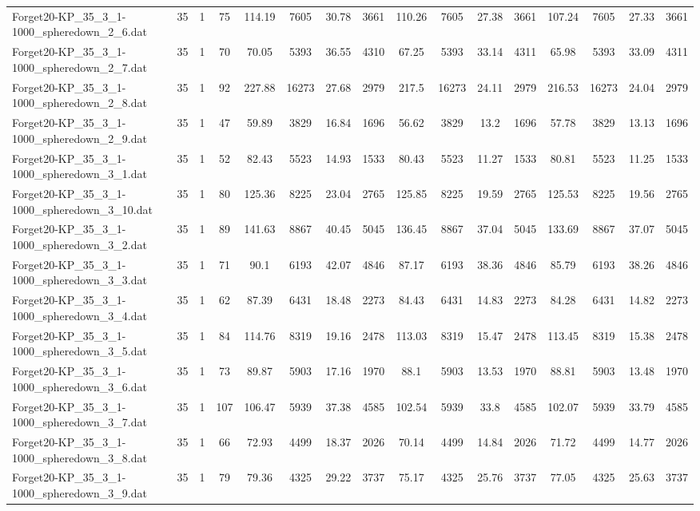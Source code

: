 \begin{sidewaystable}[!ht]
{\begin{tabular}{lccccccccccccccc}
Forget20-KP\_35\_3\_1-1000\_spheredown\_2\_6.dat & 35 & 1 & 75 & 114.19 & 7605 & 30.78 & 3661 & 110.26 & 7605 & 27.38 & 3661 & 107.24 & 7605 &  \textcolor{blue2}{27.33} & 3661 \\
Forget20-KP\_35\_3\_1-1000\_spheredown\_2\_7.dat & 35 & 1 & 70 & 70.05 & 5393 & 36.55 & 4310 & 67.25 & 5393 & 33.14 & 4311 & 65.98 & 5393 & 33.09 & 4311 \\
Forget20-KP\_35\_3\_1-1000\_spheredown\_2\_8.dat & 35 & 1 & 92 & 227.88 & 16273 & 27.68 & 2979 & 217.5 & 16273 & 24.11 & 2979 & 216.53 & 16273 & 24.04 & 2979 \\
Forget20-KP\_35\_3\_1-1000\_spheredown\_2\_9.dat & 35 & 1 & 47 & 59.89 & 3829 & 16.84 & 1696 & 56.62 & 3829 & 13.2 & 1696 & 57.78 & 3829 & 13.13 & 1696 \\
Forget20-KP\_35\_3\_1-1000\_spheredown\_3\_1.dat & 35 & 1 & 52 & 82.43 & 5523 & 14.93 & 1533 & 80.43 & 5523 & 11.27 & 1533 & 80.81 & 5523 & 11.25 & 1533 \\
Forget20-KP\_35\_3\_1-1000\_spheredown\_3\_10.dat & 35 & 1 & 80 & 125.36 & 8225 & 23.04 & 2765 & 125.85 & 8225 & 19.59 & 2765 & 125.53 & 8225 & 19.56 & 2765 \\
Forget20-KP\_35\_3\_1-1000\_spheredown\_3\_2.dat & 35 & 1 & 89 & 141.63 & 8867 & 40.45 & 5045 & 136.45 & 8867 & 37.04 & 5045 & 133.69 & 8867 & 37.07 & 5045 \\
Forget20-KP\_35\_3\_1-1000\_spheredown\_3\_3.dat & 35 & 1 & 71 & 90.1 & 6193 & 42.07 & 4846 & 87.17 & 6193 & 38.36 & 4846 & 85.79 & 6193 & 38.26 & 4846 \\
Forget20-KP\_35\_3\_1-1000\_spheredown\_3\_4.dat & 35 & 1 & 62 & 87.39 & 6431 & 18.48 & 2273 & 84.43 & 6431 & 14.83 & 2273 & 84.28 & 6431 & 14.82 & 2273 \\
Forget20-KP\_35\_3\_1-1000\_spheredown\_3\_5.dat & 35 & 1 & 84 & 114.76 & 8319 & 19.16 & 2478 & 113.03 & 8319 & 15.47 & 2478 & 113.45 & 8319 & 15.38 & 2478 \\
Forget20-KP\_35\_3\_1-1000\_spheredown\_3\_6.dat & 35 & 1 & 73 & 89.87 & 5903 & 17.16 & 1970 & 88.1 & 5903 & 13.53 & 1970 & 88.81 & 5903 & 13.48 & 1970 \\
Forget20-KP\_35\_3\_1-1000\_spheredown\_3\_7.dat & 35 & 1 & 107 & 106.47 & 5939 & 37.38 & 4585 & 102.54 & 5939 & 33.8 & 4585 & 102.07 & 5939 & 33.79 & 4585 \\
Forget20-KP\_35\_3\_1-1000\_spheredown\_3\_8.dat & 35 & 1 & 66 & 72.93 & 4499 & 18.37 & 2026 & 70.14 & 4499 & 14.84 & 2026 & 71.72 & 4499 & 14.77 & 2026 \\
Forget20-KP\_35\_3\_1-1000\_spheredown\_3\_9.dat & 35 & 1 & 79 & 79.36 & 4325 & 29.22 & 3737 & 75.17 & 4325 & 25.76 & 3737 & 77.05 & 4325 &  \textcolor{blue2}{25.63} & 3737 \\

\end{tabular}}
\end{sidewaystable}
